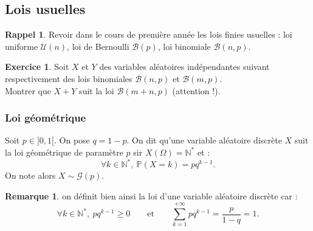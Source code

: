\documentclass[french]{article}
\renewcommand{\P}{\mathbb{P}}
\newcommand{\N}{\mathbb{N}}
\newcommand{\st}{^*}
\theoremstyle{plain}
\theoremstyle{definition}
\newtheorem{exo}{Exercice}
\newtheorem*{rmq}{Remarque}
\newtheorem*{rappel}{Rappel}
\theoremstyle{remark}
\begin{document}
\subsection{Lois usuelles}

\begin{rappel}
	Revoir dans le cours de première année les lois finies usuelles : loi uniforme $\mathcal{U}(n)$, loi de Bernoulli $\mathcal{B}(p)$, loi binomiale $\mathcal{B}(n,p)$.
\end{rappel}

\begin{exo}
	Soit $X$ et $Y$ des variables aléatoires indépendantes suivant respectivement des lois binomiales $\mathcal{B}(n,p)$ et $\mathcal{B}(m,p)$.\\
	Montrer que $X+Y$ suit la loi $\mathcal{B}(m+n,p)$ (attention !).
\end{exo}

\subsubsection*{Loi géométrique}

\begin{dfn}
	Soit $p\in]0,1[$. On pose $q=1-p$. On dit qu'une variable aléatoire discrète $X$ suit la loi géométrique de paramètre $p$ sir $X(\Omega)=\N\st$ et :
	$$\forall k\in\N\st,\ \P(X=k)=pq^{k-1}.$$
	On note alors $X\sim\mathcal{G}(p)$.
\end{dfn}

\begin{rmq}
	on définit bien ainsi la loi d'une variable aléatoire discrète car :
	$$\forall k\in\N\st,\ pq^{k-1}\geqslant0\quad\quad\text{et}\quad\quad\sum_{k=1}^{+\infty}pq^{k-1}=\frac{p}{1-q}=1.$$
\end{rmq}
\end{document}
